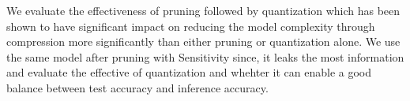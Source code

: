 
We evaluate the effectiveness of pruning followed by quantization which has been shown to have significant impact on reducing the model complexity through compression more significantly than either pruning or quantization alone.
We use the same model after pruning with Sensitivity since, it leaks the most information and evaluate the effective of quantization and whehter it can enable a good balance between test accuracy and inference accuracy.
